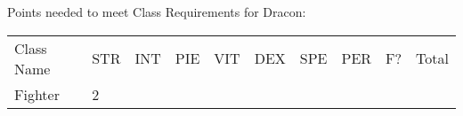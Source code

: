 \documentclass[12pt]{article}
\newcommand{\indexRace}[1]{\index{#1}}
\newcommand{\race}[1]{#1\indexRace{#1}}
\newcommand{\indexClass}[1]{\index{#1}}
\newcommand{\class}[1]{#1\indexClass{#1}}
\begin{document}
Points needed to meet Class Requirements for \race{Dracon}:

\begin{longtable}[]{@{}llllllllll@{}}
\toprule
\begin{minipage}[t]{0.13\columnwidth}\raggedright\strut
Class Name
\strut\end{minipage} &
\begin{minipage}[t]{0.06\columnwidth}\raggedright\strut
STR
\strut\end{minipage} &
\begin{minipage}[t]{0.06\columnwidth}\raggedright\strut
INT
\strut\end{minipage} &
\begin{minipage}[t]{0.06\columnwidth}\raggedright\strut
PIE
\strut\end{minipage} &
\begin{minipage}[t]{0.06\columnwidth}\raggedright\strut
VIT
\strut\end{minipage} &
\begin{minipage}[t]{0.06\columnwidth}\raggedright\strut
DEX
\strut\end{minipage} &
\begin{minipage}[t]{0.06\columnwidth}\raggedright\strut
SPE
\strut\end{minipage} &
\begin{minipage}[t]{0.06\columnwidth}\raggedright\strut
PER
\strut\end{minipage} &
\begin{minipage}[t]{0.07\columnwidth}\raggedright\strut
F?
\strut\end{minipage} &
\begin{minipage}[t]{0.08\columnwidth}\raggedright\strut
Total
\strut\end{minipage}\tabularnewline
\begin{minipage}[t]{0.13\columnwidth}\raggedright\strut
\class{Fighter}
\strut\end{minipage} &
\begin{minipage}[t]{0.06\columnwidth}\raggedright\strut
2
\strut\end{minipage} &
\begin{minipage}[t]{0.06\columnwidth}\raggedright\strut
\strut\end{minipage} &
\begin{minipage}[t]{0.06\columnwidth}\raggedright\strut
\strut\end{minipage} &
\begin{minipage}[t]{0.06\columnwidth}\raggedright\strut
\strut\end{minipage} &

\end{longtable}
\end{document}
